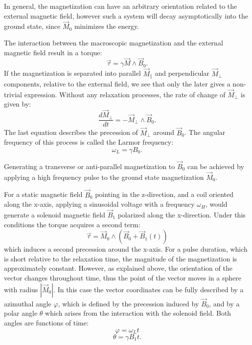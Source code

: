 In general, the magnetization can have an arbitrary orientation related to the external magnetic field, however such a system will decay asymptotically into the ground state, since $\vec{M}_0$ minimizes the energy. 

The interaction between the macroscopic magnetization and the external magnetic field result in a torque:
\begin{equation}
\vec{\tau} = \gamma\vec{M} \wedge\vec{B}_0.
\end{equation}
If the magnetization is separated into parallel $\vec{M}_{\parallel}$ and perpendicular $\vec{M}_{\perp}$ components, relative to the external field, we  see that only the later gives a non-trivial expression. Without any relaxation processes, the rate of change of $\vec{M}_\perp$ is given by:
\begin{equation}
\frac{d \vec{M}_{\perp}}{dt} = -\vec{M}_{\perp}\wedge\vec{B}_0.
\end{equation}
The last equation describes the precession of $\vec{M}_{\perp}$ around $\vec{B}_0$. The angular frequency of this process is called the Larmor frequency:
\begin{equation}
\label{eq: larmor freq}
\omega_L = \gamma B_0.
\end{equation}

Generating a transverse or anti-parallel magnetization to $\vec{B}_0$ can be achieved by applying a high frequency pulse to the ground state magnetization $\vec{M}_0$. 

For a static magnetic field $\vec{B}_0$ pointing in the z-direction, and a coil oriented along the x-axis, applying a sinusoidal voltage with a frequency $\omega_H$, would generate a solenoid magnetic field $\vec{B}_1$ polarized along the x-direction. Under this conditions the torque  acquires a second term:
\begin{equation}
\vec{\tau} = \vec{M}_0\wedge\left(\vec{B}_0 + \vec{B}_1(t)\right)
\end{equation}
which induces a second precession around the x-axis.
For a pulse duration, which is short relative to the relaxation time, the magnitude of the magnetization is approximately constant. 
However, as explained above, the orientation of the vector changes throughout time, thus the point of the vector moves in a sphere with radius $|\vec{M}_0|$. In this case the vector coordinates can be fully described by a azimuthal angle $\varphi$, which is defined by the precession induced by $\vec{B}_0$, and by a polar angle $\theta$ which arises from the interaction with the solenoid field. Both angles are functions of time:
\begin{equation}
\varphi = \omega_L t
\end{equation}
\begin{equation}
\theta = \gamma B_1 t.
\end{equation}


